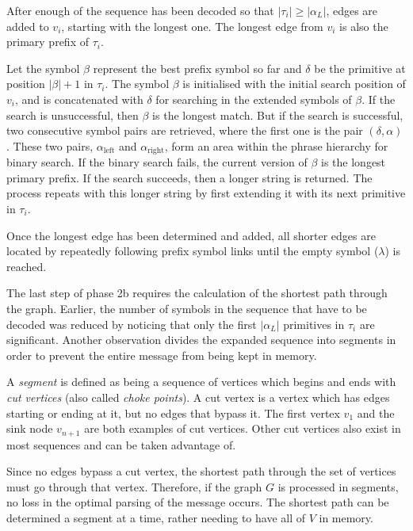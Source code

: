 
After enough of the sequence has been 
decoded so that $|\tau_i| \ge |\alpha_L|$, edges are added to 
$v_i$, starting with the longest one.
The longest edge from $v_i$ is also the primary prefix of 
$\tau_i$.

Let the symbol $\beta$ represent the best prefix symbol so far and
$\delta$ be the primitive at position $|\beta| + 1$ in $\tau_i$.  
The symbol $\beta$ is initialised with the initial search position
of $v_i$, and is concatenated with $\delta$ for
searching in the extended symbols of $\beta$.  If the search is unsuccessful,
then $\beta$ is the longest match.  But if the search is successful,
two consecutive symbol pairs are retrieved, where the first one is
the pair $(\delta, \alpha)$.  These two pairs, $\alpha_\textrm{left}$
and $\alpha_\textrm{right}$, form an area within the
phrase hierarchy for binary search.  If the binary search fails,
the current version of $\beta$ is the longest primary
prefix.  If the search succeeds, then a longer string is returned.
The process repeats with this longer string by first 
extending it with its next primitive in $\tau_i$.

Once the longest edge has been determined and added, 
all shorter edges are located by repeatedly following prefix symbol 
links until the empty symbol ($\lambda$) is reached.  


The last step of phase 2b requires the calculation of the
shortest path through the graph.  Earlier, the number of symbols
in the sequence that have to be decoded was reduced by
noticing that only the first $|\alpha_L|$ primitives in $\tau_i$
are significant.  Another observation divides the expanded
sequence into segments in order to prevent the entire
message from being kept in memory.

A {\emph {segment}} is defined as being a sequence of 
vertices which begins and ends with {\emph {cut vertices}} 
(also called {\emph {choke points}}).
A cut vertex is a vertex which has edges starting or ending
at it, but no edges that bypass it.  The first vertex $v_1$
and the sink node $v_{n + 1}$ are both examples of cut 
vertices.  Other cut vertices also exist in most sequences
and can be taken advantage of.

Since no edges bypass a cut vertex, the shortest path
through the set of vertices must go through that vertex.  
Therefore, if the graph $G$ is processed in segments, no
loss in the optimal parsing of the message occurs.
The shortest path can be determined a
segment at a time, rather needing to have all of $V$ in
memory.

